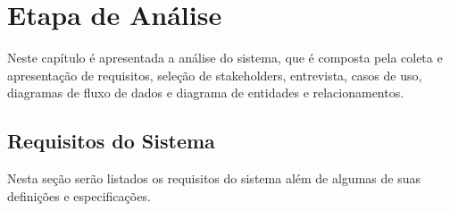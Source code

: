
\chapter{Etapa de An\'{a}lise}

Neste capítulo é apresentada a análise do sistema, que é composta pela coleta e apresentação de
requisitos, seleção de stakeholders, entrevista, casos de uso, diagramas de fluxo de dados e diagrama
de entidades e relacionamentos.


\section{Requisitos do Sistema}

Nesta seção serão listados os requisitos do sistema além de algumas de suas definições e especificações.

